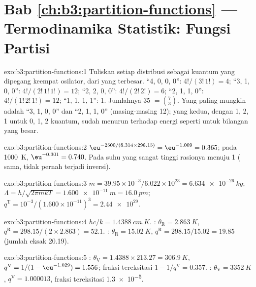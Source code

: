\section*{Bab \ref{ch:b3:partition-functions} --- Termodinamika Statistik: Fungsi Partisi}

\begin{solution}{exo:b3:partition-functions:1}
Tuliskan setiap distribusi sebagai kuantum yang dipegang keempat osilator,
dari yang terbesar. ``4, 0, 0, 0'': $4!/(3!\,1!) = 4$; ``3, 1, 0, 0'':
$4!/(2!\,1!\,1!) = 12$; ``2, 2, 0, 0'':
$4!/(2!\,2!) = 6$; ``2, 1, 1, 0'': $4!/(1!\,2!\,1!) = 12$; ``1, 1, 1, 1'': 1. Jumlahnya 35 $= \binom73$.
Yang paling mungkin adalah ``3, 1, 0, 0'' dan ``2, 1, 1, 0'' (masing-masing 12);
yang kedua, dengan  1, 2, 1 untuk 0, 1, 2 kuantum, sudah menurun
terhadap energi seperti  untuk bilangan yang besar.
\end{solution}

\begin{solution}{exo:b3:partition-functions:2}
$\eu^{-2500/(8.314 \times 298.15)} = \eu^{-1.009} = 0.365$; pada \qty{1000}{K}, $\eu^{-0.301} = 0.740$.
Pada suhu yang sangat tinggi rasionya menuju 1 ( sama, tidak pernah
terjadi inversi).
\end{solution}

\begin{solution}{exo:b3:partition-functions:3}
$m = 39.95\times10^{-3}/6.022\times10^{23} = \qty{6.634e-26}{kg}$; $\Lambda = h/\sqrt{2\pi mkT} =
\qty{1.600e-11}{m} = \qty{16.0}{pm}$; $q^{\mathrm T} = 10^{-3}/(1.600\times10^{-11})^3 = \num{2.44e29}$.
\end{solution}

\begin{solution}{exo:b3:partition-functions:4}
$hc/k = \qty{1.4388}{cm.K}$. : $\theta_{\mathrm R} = \qty{2.863}{K}$, $q^{\mathrm R} = 298.15/(2 \times 2.863) = 52.1$.
: $\theta_{\mathrm R} = \qty{15.02}{K}$, $q^{\mathrm R} = 298.15/15.02 = 19.85$ (jumlah eksak 20.19).
\end{solution}

\begin{solution}{exo:b3:partition-functions:5}
: $\theta_{\mathrm V} = 1.4388 \times 213.27 = \qty{306.9}{K}$, $q^{\mathrm V} = 1/(1 - \eu^{-1.029}) = 1.556$;
fraksi tereksitasi $1 - 1/q^{\mathrm V} = 0.357$. : $\theta_{\mathrm V} = \qty{3352}{K}$,
$q^{\mathrm V} = 1.000013$, fraksi tereksitasi \num{1.3e-5}.
\end{solution}

